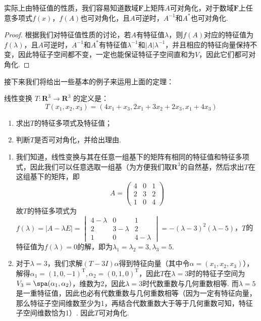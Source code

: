 实际上由特征值的性质，我们容易知道数域$\mathbf{F}$上矩阵$A$可对角化，对于数域$\mathbf{F}$上任意多项式$f(x)$，$f(A)$也可对角化，且$A$可逆时，$A^{-1}$和$A^*$也可对角化.

\begin{proof}
    根据我们对特征值性质的讨论，若$A$有特征值$\lambda$，则$f(A)$对应的特征值为$f(\lambda)$，且$A$可逆时，$A^{-1}$和$A^*$有特征值$\lambda^{-1}$和$|A|\lambda^{-1}$，并且相应的特征向量保持不变，因此特征子空间都不变，一定也能保证特征子空间直和为$V$，因此它们都可对角化.
\end{proof}

接下来我们将给出一些基本的例子来运用上面的定理：
\begin{example}
    线性变换 $T : \mathbf{R}^3 \to \mathbf{R}^3$ 的定义是：
    \[T(x_1,x_2,x_3)=(4x_1+x_3,2x_1+3x_2+2x_3,x_1+4x_3)\]
    \begin{enumerate}
        \item 求出$T$的特征多项式及特征值；

        \item 判断$T$是否可对角化，并给出理由.
    \end{enumerate}
\end{example}

\begin{solution}
    \begin{enumerate}
        \item 我们知道，线性变换与其在任意一组基下的矩阵有相同的特征值和特征多项式，因此我们可以任意选取一组基（为方便我们取$\mathbf{R}^3$的自然基，然后求出$T$在这组基下的矩阵，即
              \[A=\begin{pmatrix}
                      4 & 0 & 1 \\
                      2 & 3 & 2 \\
                      1 & 0 & 4
                  \end{pmatrix}\]
              故$T$的特征多项式为$f(\lambda)=|A-\lambda E|=\begin{vmatrix}
                      4-\lambda & 0         & 1         \\
                      2         & 3-\lambda & 2         \\
                      1         & 0         & 4-\lambda
                  \end{vmatrix}=-(\lambda-3)^2(\lambda-5)$，$T$的特征值为$f(\lambda)=0$的解，即为$\lambda_1=\lambda_2=3,\lambda_3=5$.

        \item 对于$\lambda=3$，我们求解$(T-3I)\alpha$得到特征向量（其中令$\alpha=(x_1,x_2,x_3)$），解得$\alpha_1=(1,0,-1)^\mathrm{T},\alpha_2=(0,1,0)^\mathrm{T}$，因此$T$在$\lambda=3$时的特征子空间为$V_3=\spa(\alpha_1,\alpha_2)$，维数为2，因此$\lambda=3$时代数重数与几何重数相等. 而$\lambda=5$是一重特征值，因此也必有代数重数与几何重数相等（因为一定有特征向量，那么特征子空间维数至少为1，再结合代数重数大于等于几何重数可知，特征子空间维数恰为1）. 因此$T$可对角化.
    \end{enumerate}
\end{solution}

